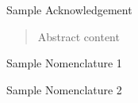 

\begin{acknowledgments}
Sample Acknowledgement
\end{acknowledgments}


\begin{abstract}

Abstract content

\end{abstract}


\tableofcontents
\listoffigures

\begin{nomenclature}
\begin{description}
\item{} Sample Nomenclature 1

\item{} Sample Nomenclature 2

\end{description}
\end{nomenclature}

\cleardoublepage{} %
